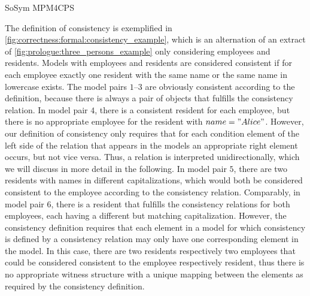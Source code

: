 \begin{copiedFrom}{SoSym MPM4CPS}
\begin{example}
The definition of consistency is exemplified in \autoref{fig:correctness:formal:consistency_example}, which is an alternation of an extract of \autoref{fig:prologue:three_persons_example} only considering employees and residents. Models with employees and residents are considered consistent if for each employee exactly one resident with the same name or the same name in lowercase exists.
The model pairs $1$--$3$ are obviously consistent according to the definition, because there is always a pair of objects that fulfills the consistency relation.
In model pair $4$, there is a consistent resident for each employee, but there is no appropriate employee for the resident with $name = "Alice"$. However, our definition of consistency only requires that for each condition element of the left side of the relation that appears in the models an appropriate right element occurs, but not vice versa. Thus, a relation is interpreted unidirectionally, which we will discuss in more detail in the following.
In model pair $5$, there are two residents with names in different capitalizations, which would both be considered consistent to the employee according to the consistency relation.
Comparably, in model pair $6$, there is a resident that fulfills the consistency relations for both employees, each having a different but matching capitalization. 
However, the consistency definition requires that each element in a model for which consistency is defined by a consistency relation may only have one corresponding element %
in the model. 
In this case, there are two residents respectively two employees that could be considered consistent to the employee respectively resident, thus there is no appropriate witness structure with a unique mapping between the elements as required by the consistency definition.
\end{example}



\end{copiedFrom}
